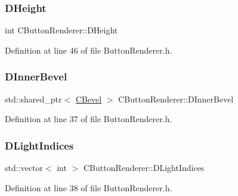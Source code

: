 \hypertarget{classCButtonRenderer_a7e3d605b90c45d87ac1396c23c90b250}{}\label{classCButtonRenderer_a7e3d605b90c45d87ac1396c23c90b250} 
\subsubsection{\texorpdfstring{D\+Height}{DHeight}}
{\footnotesize\ttfamily int C\+Button\+Renderer\+::\+D\+Height\hspace{0.3cm}{\ttfamily [protected]}}



Definition at line 46 of file Button\+Renderer.\+h.

\hypertarget{classCButtonRenderer_ab3c6dd552abb11fe7cd9db5d71648afb}{}\label{classCButtonRenderer_ab3c6dd552abb11fe7cd9db5d71648afb} 
\subsubsection{\texorpdfstring{D\+Inner\+Bevel}{DInnerBevel}}
{\footnotesize\ttfamily std\+::shared\+\_\+ptr$<$ \hyperlink{classCBevel}{C\+Bevel} $>$ C\+Button\+Renderer\+::\+D\+Inner\+Bevel\hspace{0.3cm}{\ttfamily [protected]}}



Definition at line 37 of file Button\+Renderer.\+h.

\hypertarget{classCButtonRenderer_a3f72c8f3b860fbaf43a372f112c11156}{}\label{classCButtonRenderer_a3f72c8f3b860fbaf43a372f112c11156} 
\subsubsection{\texorpdfstring{D\+Light\+Indices}{DLightIndices}}
{\footnotesize\ttfamily std\+::vector$<$ int $>$ C\+Button\+Renderer\+::\+D\+Light\+Indices\hspace{0.3cm}{\ttfamily [protected]}}



Definition at line 38 of file Button\+Renderer.\+h.

\hypertarget{classCButtonRenderer_a6b0a352b22395934e0483569d2757a48}{}\label{classCButtonRenderer_a6b0a352b22395934e0483569d2757a48} 
